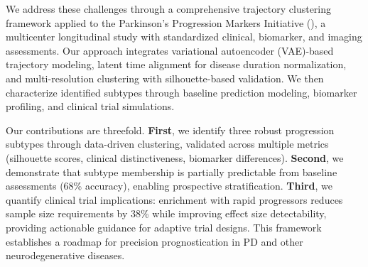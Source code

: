 We address these challenges through a comprehensive trajectory clustering framework applied to the Parkinson's Progression Markers Initiative (\ppmi), a multicenter longitudinal study with standardized clinical, biomarker, and imaging assessments\cite{marek2011ppmi}. Our approach integrates variational autoencoder (VAE)-based trajectory modeling\cite{fortuin2020gp}, latent time alignment for disease duration normalization, and multi-resolution clustering with silhouette-based validation. We then characterize identified subtypes through baseline prediction modeling, biomarker profiling, and clinical trial simulations.

Our contributions are threefold. \textbf{First}, we identify three robust progression subtypes through data-driven clustering, validated across multiple metrics (silhouette scores, clinical distinctiveness, biomarker differences). \textbf{Second}, we demonstrate that subtype membership is partially predictable from baseline assessments (68\% accuracy), enabling prospective stratification. \textbf{Third}, we quantify clinical trial implications: enrichment with rapid progressors reduces sample size requirements by 38\% while improving effect size detectability, providing actionable guidance for adaptive trial designs. This framework establishes a roadmap for precision prognostication in PD and other neurodegenerative diseases.
